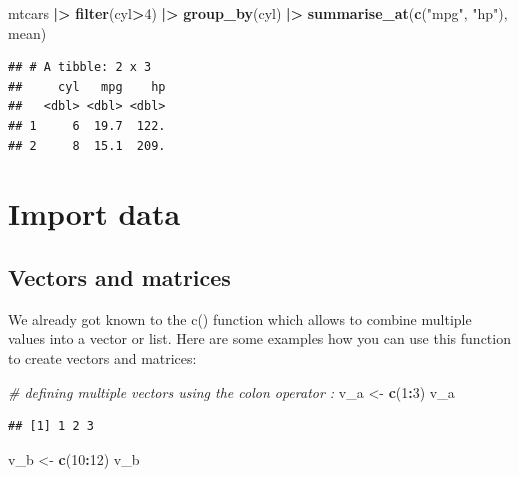 \documentclass[
  12pt,
  oneside]{book}
\newenvironment{Shaded}{\begin{snugshade}}{\end{snugshade}}
\newcommand{\CommentTok}[1]{\textcolor[rgb]{0.56,0.35,0.01}{\textit{#1}}}
\newcommand{\DecValTok}[1]{\textcolor[rgb]{0.00,0.00,0.81}{#1}}
\newcommand{\FunctionTok}[1]{\textcolor[rgb]{0.13,0.29,0.53}{\textbf{#1}}}
\newcommand{\NormalTok}[1]{#1}
\newcommand{\OtherTok}[1]{\textcolor[rgb]{0.56,0.35,0.01}{#1}}
\newcommand{\SpecialCharTok}[1]{\textcolor[rgb]{0.81,0.36,0.00}{\textbf{#1}}}
\newcommand{\StringTok}[1]{\textcolor[rgb]{0.31,0.60,0.02}{#1}}
\begin{document}
\begin{Shaded}
\begin{Highlighting}[]
\NormalTok{mtcars }\SpecialCharTok{|\textgreater{}} 
  \FunctionTok{filter}\NormalTok{(cyl}\SpecialCharTok{\textgreater{}}\DecValTok{4}\NormalTok{) }\SpecialCharTok{|\textgreater{}} 
  \FunctionTok{group\_by}\NormalTok{(cyl) }\SpecialCharTok{|\textgreater{}} 
  \FunctionTok{summarise\_at}\NormalTok{(}\FunctionTok{c}\NormalTok{(}\StringTok{"mpg"}\NormalTok{, }\StringTok{"hp"}\NormalTok{), mean)}
\end{Highlighting}
\end{Shaded}

\begin{verbatim}
## # A tibble: 2 x 3
##     cyl   mpg    hp
##   <dbl> <dbl> <dbl>
## 1     6  19.7  122.
## 2     8  15.1  209.
\end{verbatim}

\hypertarget{import-data}{%
\section{Import data}\label{import-data}}

\hypertarget{vectors-and-matrices}{%
\subsection{Vectors and matrices}\label{vectors-and-matrices}}

We already got known to the c() function which allows to combine multiple values into a vector or list. Here are some examples how you can use this function to create vectors and matrices:

\begin{Shaded}
\begin{Highlighting}[]
\CommentTok{\# defining multiple vectors using the colon operator \textasciigrave{}:\textasciigrave{}}
\NormalTok{v\_a }\OtherTok{\textless{}{-}} \FunctionTok{c}\NormalTok{(}\DecValTok{1}\SpecialCharTok{:}\DecValTok{3}\NormalTok{)}
\NormalTok{v\_a}
\end{Highlighting}
\end{Shaded}

\begin{verbatim}
## [1] 1 2 3
\end{verbatim}

\begin{Shaded}
\begin{Highlighting}[]
\NormalTok{v\_b }\OtherTok{\textless{}{-}} \FunctionTok{c}\NormalTok{(}\DecValTok{10}\SpecialCharTok{:}\DecValTok{12}\NormalTok{)}
\NormalTok{v\_b}
\end{Highlighting}
\end{Shaded}
\end{document}
